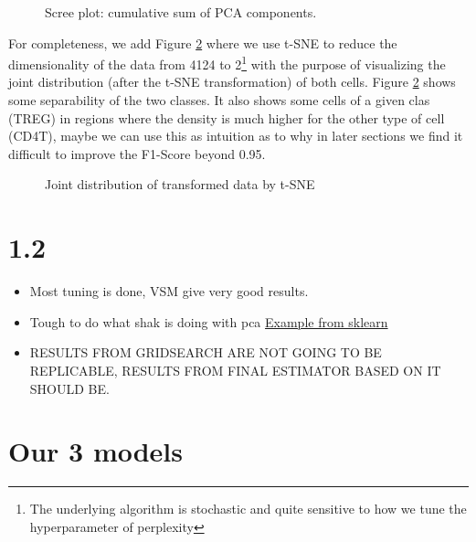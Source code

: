 \documentclass{article}
\begin{document}
\begin{figure}[h]
    
    
    \caption{Scree plot: cumulative sum of PCA components.}\label{fig:scree}
\end{figure}

For completeness, we add Figure \ref{fig:tsne} where we use t-SNE to reduce the dimensionality of the data from 4124 to 2\footnote{ The underlying algorithm is stochastic 
and quite sensitive to how we tune the hyperparameter of perplexity} with the purpose of visualizing the joint distribution (after the t-SNE transformation) of both cells. 
Figure \ref{fig:tsne} shows some separability of the two classes. It also shows some cells of a given clas (TREG) in regions where the density is much higher for the other type of cell (CD4T), maybe we can use this as intuition as to why
in later sections we find it difficult to improve the F1-Score beyond 0.95.


\begin{figure}[h]
    
    
    \caption{Joint distribution of transformed data by t-SNE}\label{fig:tsne}
\end{figure}

\section{1.2}

\begin{itemize}
    \item Most tuning is done, VSM give very good results.
    \item Tough to do what shak is doing with pca \href{https://scikit-learn.org/1.5/auto_examples/compose/plot_digits_pipe.html}{Example from sklearn}

    \item RESULTS FROM GRIDSEARCH ARE NOT GOING TO BE REPLICABLE, RESULTS FROM FINAL ESTIMATOR BASED ON IT SHOULD BE.
\end{itemize}


\section{Our 3 models}\label{sec:1.3}
\end{document}
